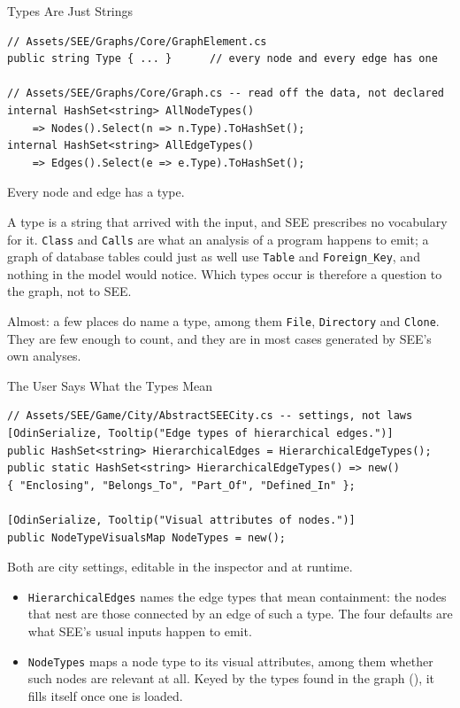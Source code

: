 \begin{frame}[fragile]{Types Are Just Strings}
  \begin{lstlisting}[basicstyle=\scriptsize\ttfamily]
// Assets/SEE/Graphs/Core/GraphElement.cs
public string Type { ... }      // every node and every edge has one

// Assets/SEE/Graphs/Core/Graph.cs -- read off the data, not declared
internal HashSet<string> AllNodeTypes()
    => Nodes().Select(n => n.Type).ToHashSet();
internal HashSet<string> AllEdgeTypes()
    => Edges().Select(e => e.Type).ToHashSet();
  \end{lstlisting}
  \vspace{1ex}

  Every node and edge has a type.
  \vspace{1ex}

  A type is a string that arrived with the input, and SEE prescribes no
  vocabulary for it. \texttt{Class} and \texttt{Calls} are what an analysis of
  a program happens to emit; a graph of database tables could just as well use
  \texttt{Table} and \texttt{Foreign\_Key}, and nothing in the model would
  notice. Which types occur is therefore a question to the graph, not to SEE.
  \vspace{1ex}

  Almost: a few places do name a type, among them \texttt{File},
  \texttt{Directory} and \texttt{Clone}. They are few enough to count, and they
  are in most cases generated by SEE's own analyses.
\end{frame}

\begin{frame}[fragile]{The User Says What the Types Mean}
  \begin{lstlisting}[basicstyle=\scriptsize\ttfamily]
// Assets/SEE/Game/City/AbstractSEECity.cs -- settings, not laws
[OdinSerialize, Tooltip("Edge types of hierarchical edges.")]
public HashSet<string> HierarchicalEdges = HierarchicalEdgeTypes();
public static HashSet<string> HierarchicalEdgeTypes() => new()
{ "Enclosing", "Belongs_To", "Part_Of", "Defined_In" };

[OdinSerialize, Tooltip("Visual attributes of nodes.")]
public NodeTypeVisualsMap NodeTypes = new();
  \end{lstlisting}
  \vspace{1ex}

  Both are city settings, editable in the inspector and at runtime.
  \begin{itemize}
    \item \texttt{HierarchicalEdges} names the edge types that mean
      containment: the nodes that nest are those connected by an edge of such a
      type. The four defaults are what SEE's usual inputs happen to emit.
    \item \texttt{NodeTypes} maps a node type to its visual attributes, among
      them whether such nodes are relevant at all. Keyed by the types found in
      the graph (), it fills itself once one is loaded.
  \end{itemize}
\end{frame}

